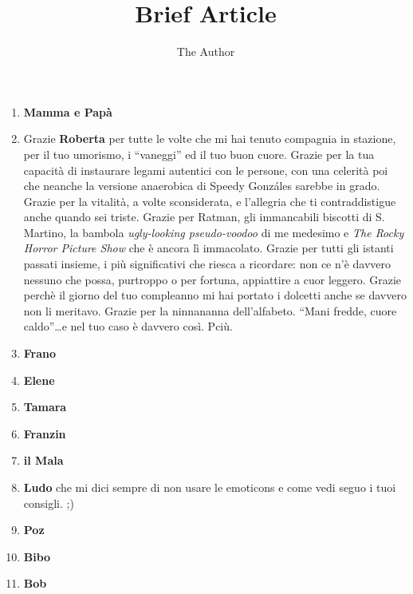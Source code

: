 \documentclass[11pt]{amsart}
\title{Brief Article}
\author{The Author}
\newcommand{\n}[1]{{\bf #1}}
\begin{document}
\maketitle

\begin{enumerate}[]
\item \n{Mamma e Papà}
\item Grazie \n{Roberta} per tutte le volte che mi hai tenuto compagnia in stazione, per il tuo umorismo, i ``vaneggi'' ed il tuo buon cuore. Grazie per la tua capacità di instaurare legami autentici con le persone, con una celerità poi che neanche la versione anaerobica di Speedy Gonz\'ales sarebbe in grado. Grazie per la vitalità, a volte sconsiderata, e l'allegria che ti contraddistigue anche quando sei triste. Grazie per Ratman, gli immancabili biscotti di S. Martino, la bambola \emph{ugly-looking pseudo-voodoo} di me medesimo e \emph{The Rocky Horror Picture Show} che è ancora lì immacolato. Grazie per tutti gli istanti passati insieme, i più significativi che riesca a ricordare: non ce n'è davvero nessuno che possa, purtroppo o per fortuna, appiattire  a cuor leggero. Grazie perchè il giorno del tuo compleanno mi hai portato i dolcetti anche se davvero non li meritavo.  Grazie per la ninnananna dell'alfabeto. ``Mani fredde, cuore caldo''\ldots e nel tuo caso è davvero così. Pciù.
\item \n{Frano}
\item \n{Elene}
\item \n{Tamara}
\item \n{Franzin}
\item \n{il Mala}
\item \n{Ludo} che mi dici sempre di non usare le emoticons e come vedi seguo i tuoi consigli. ;)

\item \n{Poz}
\item \n{Bibo}
\item \n{Bob}


\end{enumerate}
\end{document}
